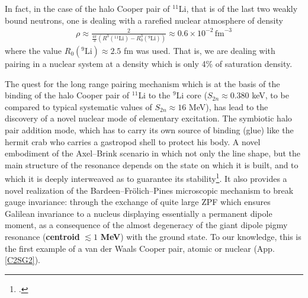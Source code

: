 \begin{subappendices}
In fact, in the case of the halo Cooper pair of $^{11}$Li, that is of the last two weakly bound neutrons, one is dealing with a rarefied nuclear atmosphere of density
\begin{align}\label{eq5App3E}
\rho\approx\frac{2}{\frac{4\pi}{3}(R^3(^{11}\text{Li})-R_0^3(^{9}\text{Li}))}\approx 0.6\times 10^{-2}\,\text{fm}^{-3}
\end{align}
where the value $R_0(^9\text{Li})\approx 2.5$ fm was used. That is, we are dealing with pairing in a nuclear system at a density which is only 4\% of saturation density.

The quest for the long range pairing mechanism which is at the basis of the binding of the halo Cooper pair of $^{11}$Li to the $^9$Li core ($S_{2n}\approx0.380$ keV, to be compared to typical systematic values of $S_{2n}\approx 16$ MeV), has lead to the discovery of a novel nuclear mode of elementary excitation. The symbiotic halo pair addition mode, which has to carry its own source of binding (glue) like the hermit crab who carries a gastropod shell to protect his body. A novel embodiment of the Axel--Brink scenario in which not only the line shape, but the main structure of the resonance depends on the state on which it is built, and to which it is deeply interweaved as to guarantee its stability\footnote{\cite{Axel:62,Brink:55}.}. It also provides a novel realization of the Bardeen--Fr\"olich--Pines microscopic mechanism to break gauge invariance: through the exchange of quite large ZPF which ensures Galilean invariance to a nucleus displaying essentially a permanent dipole moment, as a consequence of the almost degeneracy of the giant dipole pigmy resonance (\textbf{centroid} $\lesssim 1$ \textbf{MeV}) with the ground state. To our knowledge, this is the first example of a van der Waals Cooper pair, atomic or nuclear (App. \ref{C2SG2}).



\end{subappendices}
